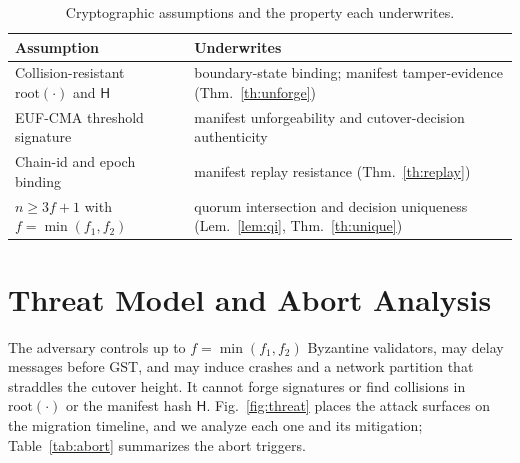 \documentclass[journal]{IEEEtran}
\begin{document}
\begin{table}[t]
\centering
\caption{Cryptographic assumptions and the property each underwrites.}
\label{tab:crypto}
\renewcommand{\arraystretch}{1.15}
\footnotesize
\begin{tabular}{p{}p{}}
\toprule
Assumption & Underwrites \\
\midrule
Collision-resistant $\mathrm{root}(\cdot)$ and $\mathsf{H}$ & boundary-state binding; manifest tamper-evidence (Thm.~\ref{th:unforge}) \\
EUF-CMA threshold signature & manifest unforgeability and cutover-decision authenticity \\
Chain-id and epoch binding & manifest replay resistance (Thm.~\ref{th:replay}) \\
$n \ge 3f+1$ with $f=\min(f_1,f_2)$ & quorum intersection and decision uniqueness (Lem.~\ref{lem:qi}, Thm.~\ref{th:unique}) \\
\bottomrule
\end{tabular}
\end{table}

\section{Threat Model and Abort Analysis}
\label{sec:threat}

The adversary controls up to $f=\min(f_1,f_2)$ Byzantine validators, may delay messages
before GST, and may induce crashes and a network partition that straddles the cutover height.
It cannot forge signatures or find collisions in $\mathrm{root}(\cdot)$ or the manifest hash
$\mathsf{H}$. Fig.~\ref{fig:threat} places the attack surfaces on the migration timeline, and
we analyze each one and its mitigation; Table~\ref{tab:abort} summarizes the abort triggers.
\end{document}
